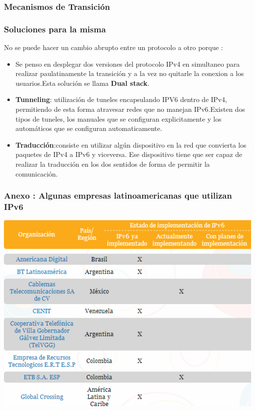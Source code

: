 \documentclass{beamer}
\begin{document}
\begin{frame}
\frametitle{Mecanismos de Transición}
\frametitle{Soluciones para la misma}
No se puede hacer un cambio abrupto entre un protocolo a otro porque : 
\begin{itemize}
\item Se penso en desplegar dos versiones del protocolo IPv4 en simultaneo para realizar paulatinamente la transición y a la vez  no quitarle la conexion a los usuarios.Esta solución se llama \textbf{Dual stack}.

\item \textbf{Tunneling}: utilización de tuneles encapsulando IPV6 dentro de IPv4, permitiendo de esta forma atravesar redes que no manejan IPv6.Existen dos tipos de tuneles, los manuales que  se configuran explicitamente y  los automáticos que se configuran automaticamente.
\item  \textbf{Traducción}:consiste en utilizar algún dispositivo en la red que convierta los paquetes de IPv4 a IPv6 y 
viceversa. Ese dispositivo tiene que ser capaz de realizar la traducción en los dos sentidos de 
forma de permitir la comunicación. 

\end{itemize}

\end{frame}

\begin{frame}
\frametitle{ Anexo : Algunas empresas latinoamericanas que utilizan IPv6}

\includegraphics[height=1\textheight]{empresas_ipv6_la.png}

\end{frame}
\end{document}
